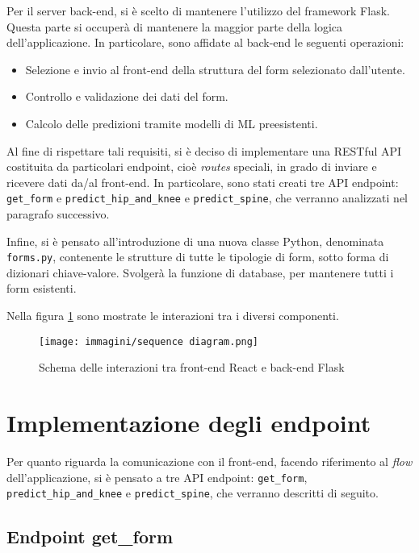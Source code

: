 Per il server back-end, si è scelto di mantenere l’utilizzo del framework Flask. 
\newline 
Questa parte si occuperà di mantenere la maggior parte della logica dell'applicazione. In particolare, sono affidate al back-end le seguenti operazioni:
\begin{itemize}
    \item Selezione e invio al front-end della struttura del form selezionato dall'utente.
    \item Controllo e validazione dei dati del form.
    \item Calcolo delle predizioni tramite modelli di ML preesistenti.
\end{itemize}
Al fine di rispettare tali requisiti, si è deciso di implementare una RESTful API costituita da particolari endpoint, cioè \textit{routes} speciali, in grado di inviare e ricevere dati da/al front-end.
\newline
In particolare, sono stati creati tre API endpoint: \verb|get_form| e \verb|predict_hip_and_knee| e \verb|predict_spine|, che verranno analizzati nel paragrafo successivo.

Infine, si è pensato all'introduzione di una nuova classe Python, denominata 
\newline
\verb|forms.py|, contenente le strutture di tutte le tipologie di form, sotto forma di dizionari chiave-valore. Svolgerà la funzione di database, per mantenere tutti i form esistenti.

Nella figura \ref{fig:interaction} sono mostrate le interazioni tra i diversi componenti.

\begin{figure}
    \centering
    \texttt{[image: immagini/sequence diagram.png]}
    \caption{Schema delle interazioni tra front-end React e back-end Flask}
    \label{fig:interaction}
\end{figure}

\section{Implementazione degli endpoint}
\label{sec:endpoint}
Per quanto riguarda la comunicazione con il front-end, facendo riferimento al \textit{flow} dell’applicazione, si è pensato a tre API endpoint: \verb|get_form|, \verb|predict_hip_and_knee| e \verb|predict_spine|, che verranno descritti di seguito.

\subsection{Endpoint get\_form}
\label{subsec:get_form}


